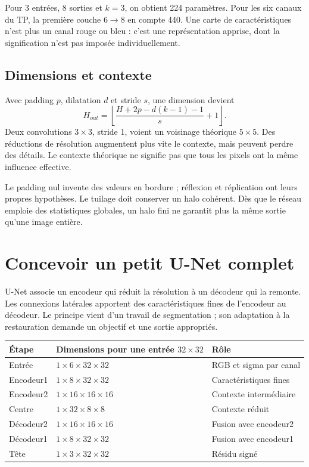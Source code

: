 \documentclass[12pt,a4paper,oneside]{report}
\begin{document}
Pour $3$ entrées, $8$ sorties et $k=3$, on obtient 224 paramètres. Pour les six
canaux du TP, la première couche $6\to8$ en compte 440. Une carte de
caractéristiques n'est plus un canal rouge ou bleu : c'est une représentation
apprise, dont la signification n'est pas imposée individuellement.

\section{Dimensions et contexte}

Avec padding $p$, dilatation $d$ et stride $s$, une dimension devient
\[
 H_{out}=\left\lfloor\frac{H+2p-d(k-1)-1}{s}+1\right\rfloor.
\]
Deux convolutions $3\times3$, stride 1, voient un voisinage théorique
$5\times5$. Des réductions de résolution augmentent plus vite le contexte,
mais peuvent perdre des détails. Le contexte théorique ne signifie pas que
tous les pixels ont la même influence effective.

Le padding nul invente des valeurs en bordure ; réflexion et réplication ont
leurs propres hypothèses. Le tuilage doit conserver un halo cohérent. Dès que
le réseau emploie des statistiques globales, un halo fini ne garantit plus la
même sortie qu'une image entière.

\chapter{Concevoir un petit U-Net complet}

U-Net associe un encodeur qui réduit la résolution à un décodeur qui la remonte.
Les connexions latérales apportent des caractéristiques fines de l'encodeur
au décodeur. Le principe vient d'un travail de segmentation ; son adaptation
à la restauration demande un objectif et une sortie appropriés.

\begin{center}
\begin{tabular}{p{}p{}p{}}
\toprule Étape & Dimensions pour une entrée $32\times32$ & Rôle \\ \midrule
Entrée & $1\times6\times32\times32$ & RGB et sigma par canal\\
Encodeur1 & $1\times8\times32\times32$ & Caractéristiques fines\\
Encodeur2 & $1\times16\times16\times16$ & Contexte intermédiaire\\
Centre & $1\times32\times8\times8$ & Contexte réduit\\
Décodeur2 & $1\times16\times16\times16$ & Fusion avec encodeur2\\
Décodeur1 & $1\times8\times32\times32$ & Fusion avec encodeur1\\
Tête & $1\times3\times32\times32$ & Résidu signé\\
\bottomrule
\end{tabular}
\end{center}
\end{document}
